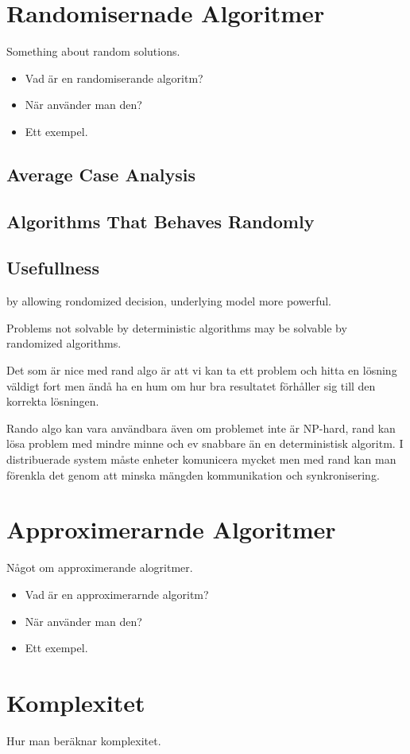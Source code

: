 \documentclass[a4paper]{report}
\begin{document}
\section{Randomisernade Algoritmer}

Something about random solutions.
\begin{itemize}
	\item Vad är en randomiserande algoritm?
	\item När använder man den?
	\item Ett exempel.
\end{itemize}

\subsection{Average Case Analysis}

\subsection{Algorithms That Behaves Randomly}

\subsection{Usefullness}
by allowing rondomized decision, underlying model more powerful.

Problems not solvable by deterministic algorithms may be solvable by randomized
algorithms.

Det som är nice med rand algo är att vi kan ta ett problem och hitta en lösning
väldigt fort men ändå ha en hum om hur bra resultatet förhåller sig till den
korrekta lösningen.

Rando algo kan vara användbara även om problemet inte är NP-hard, rand kan lösa
problem med mindre minne och ev snabbare än en deterministisk algoritm. I
distribuerade system måste enheter komunicera mycket men med rand kan man
förenkla det genom att minska mängden kommunikation och synkronisering. %

\section{Approximerarnde Algoritmer}

Något om approximerande alogritmer.
\begin{itemize}
	\item Vad är en approximerarnde algoritm?
	\item När använder man den?
	\item Ett exempel.
\end{itemize}

\section{Komplexitet}
Hur man beräknar komplexitet.
\end{document}
